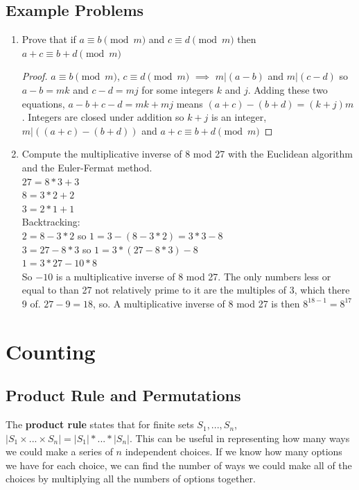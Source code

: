 \documentclass[12pt,letterpaper]{article}
\begin{document}
\subsection{Example Problems}
\begin{mdframed}
\begin{enumerate}
    \item Prove that if $a \equiv b \pmod{m}$ and $c \equiv d \pmod{m}$ then $a + c \equiv b + d \pmod{m}$ \\
    \begin{proof} $a \equiv b \pmod{m}$, $c \equiv d \pmod{m}$ $\implies$ $m | (a - b)$ and $m | (c - d)$ so $a - b = mk$ and $c - d = mj$ for some integers $k$ and $j$. Adding these two equations, $a -b + c - d = mk + mj$ means $(a+c)-(b+d)=(k + j)m$. Integers are closed under addition so $k + j$ is an integer, $m | ((a+c)-(b+d))$ and $a + c \equiv b + d \pmod{m}$
    \end{proof}
    
    \item Compute the multiplicative inverse of 8 mod 27 with the Euclidean algorithm and the Euler-Fermat method. \\
    $27 = 8 * 3 + 3$ \\
    $8 = 3 * 2 + 2$ \\
    $3 = 2 * 1 + 1$ \\
    Backtracking: \\
    $2=8-3*2$ so $1 = 3 - (8 -3*2) = 3 * 3 - 8$ \\
    $3 = 27 - 8*3$ so $1 = 3 * (27 - 8*3) - 8$ \\
    $1 = 3 * 27 - 10 * 8$ \\
    So $-10$ is a multiplicative inverse of 8 mod 27.
    The only numbers less or equal to than 27 not relatively prime to it are the multiples of 3, which there 9 of. $27-9=18$, so. A multiplicative inverse of 8 mod 27 is then $8^{18-1}=8^{17}$
\end{enumerate}
\end{mdframed}

\section{Counting}

\subsection{Product Rule and Permutations}

The \textbf{product rule} states that for finite sets $S_1,...,S_n$, $|S_1 \times ... \times S_n| = |S_1|*...*|S_n|$. This can be useful in representing how many ways we could make a series of $n$ independent choices. If we know how many options we have for each choice, we can find the number of ways we could make all of the choices by multiplying all the numbers of options together.
\end{document}
